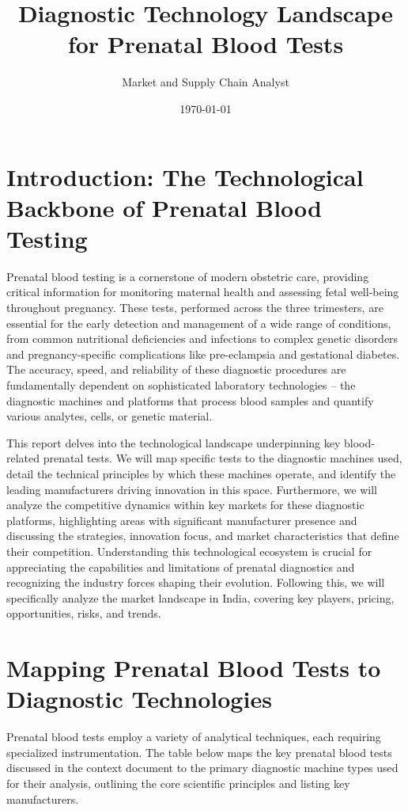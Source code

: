 \documentclass{article}
\title{Diagnostic Technology Landscape for Prenatal Blood Tests}
\author{Market and Supply Chain Analyst} %
\date{\today}
\begin{document}
\maketitle

\section{Introduction: The Technological Backbone of Prenatal Blood Testing}

Prenatal blood testing is a cornerstone of modern obstetric care, providing critical information for monitoring maternal health and assessing fetal well-being throughout pregnancy. These tests, performed across the three trimesters, are essential for the early detection and management of a wide range of conditions, from common nutritional deficiencies and infections to complex genetic disorders and pregnancy-specific complications like pre-eclampsia and gestational diabetes. The accuracy, speed, and reliability of these diagnostic procedures are fundamentally dependent on sophisticated laboratory technologies – the diagnostic machines and platforms that process blood samples and quantify various analytes, cells, or genetic material.

This report delves into the technological landscape underpinning key blood-related prenatal tests. We will map specific tests to the diagnostic machines used, detail the technical principles by which these machines operate, and identify the leading manufacturers driving innovation in this space. Furthermore, we will analyze the competitive dynamics within key markets for these diagnostic platforms, highlighting areas with significant manufacturer presence and discussing the strategies, innovation focus, and market characteristics that define their competition. Understanding this technological ecosystem is crucial for appreciating the capabilities and limitations of prenatal diagnostics and recognizing the industry forces shaping their evolution. Following this, we will specifically analyze the market landscape in India, covering key players, pricing, opportunities, risks, and trends.

\section{Mapping Prenatal Blood Tests to Diagnostic Technologies}

Prenatal blood tests employ a variety of analytical techniques, each requiring specialized instrumentation. The table below maps the key prenatal blood tests discussed in the context document to the primary diagnostic machine types used for their analysis, outlining the core scientific principles and listing key manufacturers.
\end{document}
